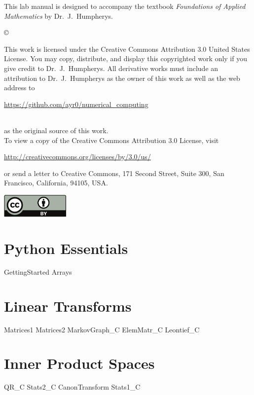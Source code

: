 \documentclass{newsiambook}
\begin{document}
\begin{thepreface}
This lab manual is designed to accompany the textbook \emph{Foundations of Applied Mathematics} by Dr.~J.~Humpherys.

\vfill
\copyright{This work is licensed under the Creative Commons Attribution 3.0 United States 
License.  You may copy, distribute, and display this copyrighted work only if you give 
credit to Dr.~J.~Humpherys. All derivative works must include an attribution to Dr.~J.~Humpherys as the owner of this work as well as the web address to 
\\\centerline{\url{https://github.com/ayr0/numerical_computing}}\\ as the original source of 
this 
work.\\To view a copy of the Creative Commons Attribution 3.0 License, 
visit\\\centerline{\url{http://creativecommons.org/licenses/by/3.0/us/}} or send a letter to 
Creative Commons, 171 Second Street, Suite 300, San Francisco, California, 94105, USA.}

\vfill
\centering\includegraphics[height=1.2cm]{by}
\vfill
\end{thepreface}

\setcounter{tocdepth}{1}
\tableofcontents

\mainmatter

\part{Python Essentials}
{GettingStarted}
{Arrays}

\part{Linear Transforms}
{Matrices1}
{Matrices2}
{MarkovGraph_C}
{ElemMatr_C}
{Leontief_C}

\part{Inner Product Spaces}
{QR_C}
{Stats2_C}
{CanonTransform} 
{Stats1_C}
\end{document}
